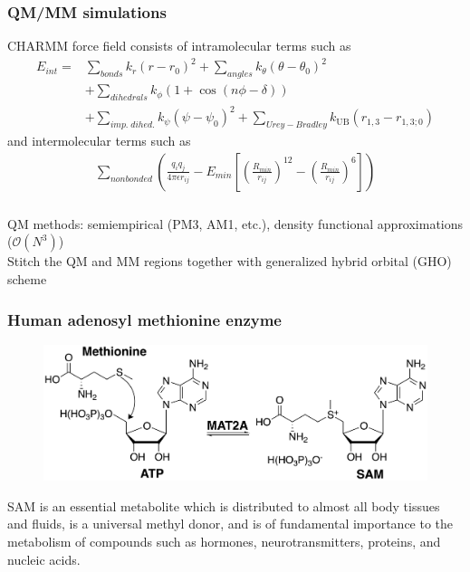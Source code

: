 \documentclass{beamer}
\begin{document}
\begin{frame}
\frametitle{QM/MM simulations}
CHARMM force field consists of intramolecular terms such as 
\begin{align}
E_{int} = &\sum_{bonds}k_r(r-r_{0})^2 + \sum_{angles}k_{\theta}(\theta - \theta_{0})^2 \nonumber \\ &+ \sum_{dihedrals}k_{\phi}(1+\cos(n\phi-\delta)) \nonumber \\
&+ \sum_{imp.\;dihed.} k_{\psi}(\psi - \psi_0)^2 + \sum_{Urey-Bradley} k_{\text{UB}}(r_{1,3}-r_{1,3;0}) \nonumber 
\end{align}\pause
and intermolecular terms such as 
\begin{align}
\sum_{nonbonded} \left(\frac{q_iq_j}{4\pi\epsilon r_{ij}} - E_{min} 
\left[\left(\frac{R_{min}}{r_{ij}}\right)^{12} - \left(\frac{R_{min}}{r_{ij}}\right)^{6} \right] \right)\nonumber 
\end{align}
\end{frame}
\begin{frame}
\frametitle{}
\newline
QM methods: semiempirical (PM3, AM1, etc.), density functional approximations ($\mathcal{O}(N^3)$) \\
Stitch the QM and MM regions together with generalized hybrid orbital (GHO) scheme 
\end{frame}
\begin{frame}
\frametitle{Human adenosyl methionine enzyme}
\begin{figure}
\centering 
\includegraphics[scale=0.6]{figures/mat2a-reaction.png}
\end{figure}
SAM is an essential metabolite which is distributed to almost all body tissues and fluids, is a
universal methyl donor, and is of fundamental importance to
the metabolism of compounds such as hormones, neurotransmitters, proteins, and nucleic acids.
\end{frame}
\end{document}

